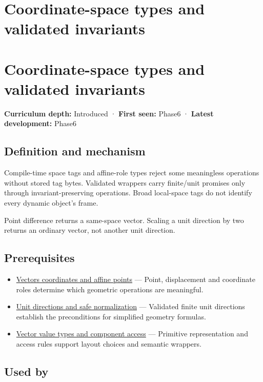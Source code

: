 \hypertarget{appendix-380a220e2529}{}
\section*{Coordinate-space types and validated invariants}
\section{Coordinate-space types and validated invariants}\label{coordinate-space-types-and-validated-invariants}

\textbf{Curriculum depth:} Introduced · \textbf{First seen:} Phase6 · \textbf{Latest development:} Phase6

\subsection{Definition and mechanism}\label{definition-and-mechanism}

Compile-time space tags and affine-role types reject some meaningless operations without stored tag bytes. Validated wrappers carry finite/unit promises only through invariant-preserving operations. Broad local-space tags do not identify every dynamic object's frame.

Point difference returns a same-space vector. Scaling a unit direction by two returns an ordinary vector, not another unit direction.

\subsection{Prerequisites}\label{prerequisites}

\begin{itemize}
\tightlist
\item
  \hyperref[appendix-0659864c0aa3]{Vectors coordinates and affine points} --- Point, displacement and coordinate roles determine which geometric operations are meaningful.
\item
  \hyperref[appendix-f744e41b95b4]{Unit directions and safe normalization} --- Validated finite unit directions establish the preconditions for simplified geometry formulas.
\item
  \hyperref[appendix-37a39984ba66]{Vector value types and component access} --- Primitive representation and access rules support layout choices and semantic wrappers.
\end{itemize}

\subsection{Used by}\label{used-by}

